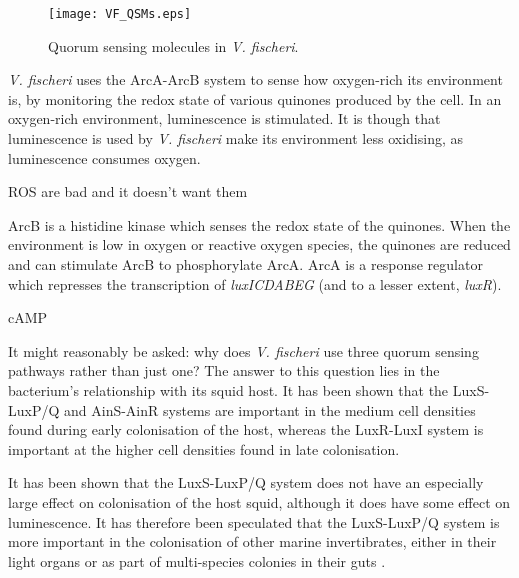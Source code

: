 \begin{figure}[H]
	\begin{center}
		\texttt{[image: VF\_QSMs.eps]}
		\caption{Quorum sensing molecules in \textit{V. fischeri}. \label{fig:VF_QSMs}}
	\end{center}
\end{figure}

 \label{sec:O2}

\textit{V. fischeri} uses the ArcA-ArcB system to sense how oxygen-rich its environment is, by monitoring the redox state of various quinones produced by the cell. 
In an oxygen-rich environment, luminescence is stimulated. It is though that luminescence is used by \textit{V. fischeri} make its environment less oxidising, as luminescence consumes oxygen. 

ROS are bad and it doesn't want them\cite{Visick2000}

 ArcB is a histidine kinase which senses the redox state of the quinones. When the environment is low in oxygen or reactive oxygen species, the quinones are reduced and can stimulate ArcB to phosphorylate ArcA. ArcA is a response regulator which represses the transcription of \textit{luxICDABEG} (and to a lesser extent, \textit{luxR}). 

 \label{sec:cAMP}

cAMP


It might reasonably be asked: why does \textit{V. fischeri} use three quorum sensing pathways rather than just one? The answer to this question lies in the bacterium's relationship with its squid host. It has been shown that the LuxS-LuxP/Q and AinS-AinR systems are important in the medium cell densities found during early colonisation of the host, whereas the LuxR-LuxI system is important at the higher cell densities found in late colonisation\cite{Lupp2003,Lupp2005}.

It has been shown that the LuxS-LuxP/Q system does not have an especially large effect on colonisation of the host squid, although it does have some effect on luminescence\cite{Lupp2004}. It has therefore been speculated that the LuxS-LuxP/Q system is more important in the colonisation of other marine invertibrates, either in their light organs\cite{Ruby1976,Reichelt1977} or as part of multi-species colonies in their guts \cite{Lupp2004,Ramesh1986}.

